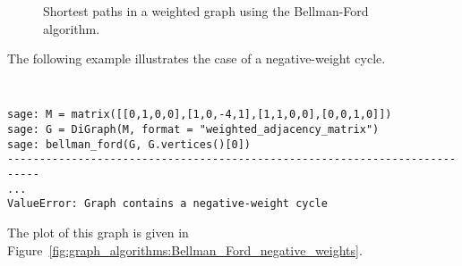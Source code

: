 \begin{figure}[!htbp]
\centering
{}
\caption{Shortest paths in a weighted graph using the Bellman-Ford
  algorithm.}
\label{fig:graph_algorithms:Bellman_Ford_example}
\end{figure}

The following example illustrates the case of a negative-weight cycle.

\begin{center}
\fontsize{9pt}{9pt}
\selectfont
\tt
\begin{lstlisting}
sage: M = matrix([[0,1,0,0],[1,0,-4,1],[1,1,0,0],[0,0,1,0]])
sage: G = DiGraph(M, format = "weighted_adjacency_matrix")
sage: bellman_ford(G, G.vertices()[0])
---------------------------------------------------------------------------
...
ValueError: Graph contains a negative-weight cycle
\end{lstlisting}
\end{center}
%
The plot of this graph is given in
Figure~\ref{fig:graph_algorithms:Bellman_Ford_negative_weights}.

